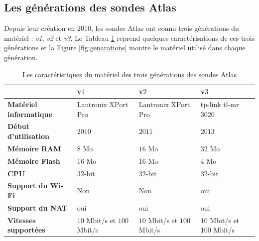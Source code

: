\subsection{Les générations des sondes  Atlas }

Depuis leur création   en $2010$, les sondes Atlas ont connu   trois générations du matériel : \textit{v1}, \textit{v2} et \textit{v3}. Le Tableau   \ref{tab:differents-generations-probes} reprend quelques  caractérisations de ces trois générations  et  la Figure 	\ref{fig:genarations} montre le matériel utilisé  dans chaque génération.


\begin{table}[H]
	\begin{tabularx}{\textwidth}{|X|X|X|X|}
		\hline
		&\textbf{v$ 1 $}&\textbf{v$ 2 $}&\textbf{v$ 3 $} \\ \hline
		\textbf{Matériel informatique}  & Lantronix XPort Pro \cite{LantronixXPortPro} &Lantronix XPort Pro \cite{LantronixXPortPro}&tp-link tl-mr$ 3020  $  \\ \hline
		\textbf{Début d'utilisation}  &$2010$&$2011$&$2013$ \\ \hline
		\textbf{Mémoire RAM} & $8$ Mo&$16$ Mo& $32$ Mo\\ \hline
		\textbf{Mémoire Flash} & $16$ Mo&$16$ Mo&$4$ Mo \\ \hline
		\textbf{CPU} &$ 32 $-bit& $ 32 $-bit & $ 32 $-bit\\ \hline
		\textbf{Support du Wi-Fi} &Non&Non&oui \\ \hline
		\textbf{Support du NAT} &oui&oui&oui \\ \hline
		\textbf{Vitesses supportées} &$ 10 $ Mbit/s et $ 100 $ Mbit/s&$ 10 $ Mbit/s et $ 100 $ Mbit/s&$ 10 $ Mbit/s et $ 100 $ Mbit/s \\ \hline
		
	\end{tabularx}
	\caption{Les caractéristiques du matériel  des trois générations des sondes  Atlas }
	\label{tab:differents-generations-probes}
\end{table}


